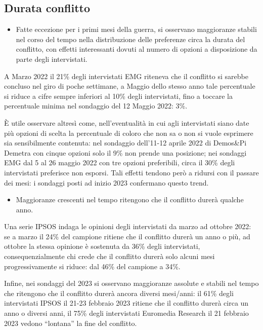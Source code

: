 \documentclass[
]{book}
\providecommand{\tightlist}{%
  \setlength{\itemsep}{0pt}\setlength{\parskip}{0pt}}
\begin{document}
\hypertarget{durata-conflitto}{%
\subsection{Durata conflitto}\label{durata-conflitto}}

\begin{itemize}
\tightlist
\item
  Fatte eccezione per i primi mesi della guerra, si osservano maggioranze stabili nel corso del tempo nella distribuzione delle preferenze circa la durata del conflitto, con effetti interessanti dovuti al numero di opzioni a disposizione da parte degli intervistati.
\end{itemize}

A Marzo 2022 il 21\% degli intervistati EMG riteneva che il conflitto si sarebbe concluso nel giro di poche settimane, a Maggio dello stesso anno tale percentuale si riduce a cifre sempre inferiori al 10\% degli intervistati, fino a toccare la percentuale minima nel sondaggio del 12 Maggio 2022: 3\%.

È utile osservare altresì come, nell'eventualità in cui agli intervistati siano date più opzioni di scelta la percentuale di coloro che non sa o non si vuole esprimere sia sensibilmente contenuta: nel sondaggio dell'11-12 aprile 2022 di Demos\&Pi Demetra con cinque opzioni solo il 9\% non prende una posizione; nei sondaggi EMG dal 5 al 26 maggio 2022 con tre opzioni preferibili, circa il 30\% degli intervistati preferisce non esporsi. Tali effetti tendono però a ridursi con il passare dei mesi: i sondaggi posti ad inizio 2023 confermano questo trend.

\begin{itemize}
\tightlist
\item
  Maggioranze crescenti nel tempo ritengono che il conflitto durerà qualche anno.
\end{itemize}

Una serie IPSOS indaga le opinioni degli intervistati da marzo ad ottobre 2022: se a marzo il 24\% del campione ritiene che il conflitto durerà un anno o più, ad ottobre la stessa opinione è sostenuta da 36\% degli intervistati, consequenzialmente chi crede che il conflitto durerà solo alcuni mesi progressivamente si riduce: dal 46\% del campione a 34\%.

Infine, nei sondaggi del 2023 si osservano maggioranze assolute e stabili nel tempo che ritengono che il conflitto durerà ancora diversi mesi/anni: il 61\% degli intervistati IPSOS il 21-23 febbraio 2023 ritiene che il conflitto durerà circa un anno o diversi anni, il 75\% degli intervistati Euromedia Research il 21 febbraio 2023 vedono ``lontana'' la fine del conflitto.
\end{document}
